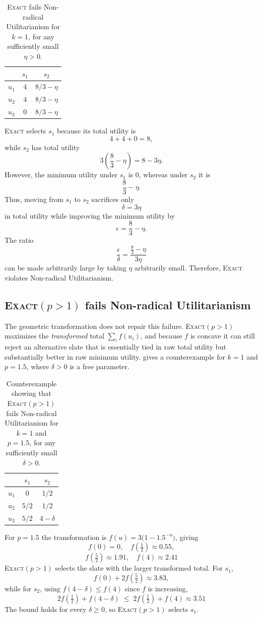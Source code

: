 \documentclass[11pt]{article}
\newcommand{\Exact}{\textsc{Exact}}
\newcommand{\ExactP}{\textsc{Exact}$(p>1)$}
\begin{document}
\begin{table}[t]
\centering
\begin{tabular}{lcc}
\hline
 & $s_1$ & $s_2$ \\
\hline
$u_1$ & $4$ & $8/3-\eta$ \\
$u_2$ & $4$ & $8/3-\eta$ \\
$u_3$ & $0$ & $8/3-\eta$ \\
\hline
\end{tabular}
\caption{\Exact{} fails Non-radical Utilitarianism for \(k=1\), for any sufficiently small \(\eta>0\).}
\label{tab:failure-exact-nru}
\end{table}

\Exact{} selects \(s_1\) because its total utility is
\[
4+4+0=8,
\]
while \(s_2\) has total utility
\[
3\left(\frac{8}{3}-\eta\right)=8-3\eta.
\]
However, the minimum utility under \(s_1\) is \(0\), whereas under \(s_2\) it is
\[
\frac{8}{3}-\eta.
\]
Thus, moving from \(s_1\) to \(s_2\) sacrifices only
\[
\delta=3\eta
\]
in total utility while improving the minimum utility by
\[
\epsilon=\frac{8}{3}-\eta.
\]
The ratio
\[
\frac{\epsilon}{\delta}
=
\frac{\frac{8}{3}-\eta}{3\eta}
\]
can be made arbitrarily large by taking \(\eta\) arbitrarily small. Therefore, \Exact{} violates Non-radical Utilitarianism.

\subsection{\ExactP{} fails Non-radical Utilitarianism}
\label{app:exactp-nru}

The geometric transformation does not repair this failure. \ExactP{}
maximizes the \emph{transformed} total $\sum_i f(u_i)$, and because $f$ is
concave it can still reject an alternative slate that is essentially tied in
raw total utility but substantially better in raw minimum utility.
 gives a counterexample for $k=1$ and $p=1.5$,
where $\delta>0$ is a free parameter.
\begin{table}[t]
\centering
\begin{tabular}{lcc}
\hline
 & $s_1$ & $s_2$ \\
\hline
$u_1$ & $0$   & $1/2$ \\
$u_2$ & $5/2$ & $1/2$ \\
$u_3$ & $5/2$ & $4-\delta$ \\
\hline
\end{tabular}
\caption{Counterexample showing that \ExactP{} fails Non-radical
Utilitarianism for \(k=1\) and \(p=1.5\), for any sufficiently small
\(\delta>0\).}
\label{tab:failure-exactp-nru}
\end{table}
For \(p=1.5\) the transformation is \(f(u)=3\bigl(1-1.5^{-u}\bigr)\), giving
\[
f(0)=0,\quad f(\tfrac12)\approx0.55,
\]
\[
f(\tfrac52)\approx1.91,\quad f(4)\approx2.41
\]
\ExactP{} selects the slate with the larger transformed total. For \(s_1\),
\[
f(0)+2f(\tfrac52)\approx3.83,
\]
while for \(s_2\), using \(f(4-\delta)\le f(4)\) since \(f\) is increasing,
\[
2f(\tfrac12)+f(4-\delta)\;\le\;2f(\tfrac12)+f(4)\approx3.51
\]
The bound holds for every \(\delta\ge 0\), so \ExactP{} selects \(s_1\).
\end{document}
